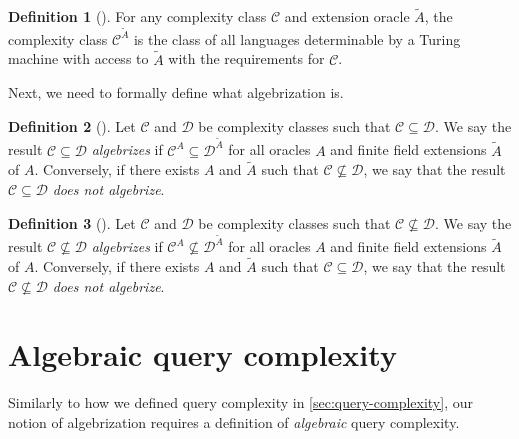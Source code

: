 \documentclass[english,12pt]{reedthesis}
\theoremstyle{plain}
\theoremstyle{definition}
\newtheorem{defn}[defn]{Definition}
\theoremstyle{remark}
\begin{document}
\begin{defn}[{\cite[Def.\ 2.2]{AW09}}]\label{def:ext-oracle-class}
  For any complexity class $\mathcal{C}$ and extension oracle $\tilde{A}$, the complexity
  class $\mathcal{C}^{\tilde{A}}$ is the class of all languages determinable by a Turing
  machine with access to $\tilde{A}$ with the requirements for $\mathcal{C}$.
\end{defn}

Next, we need to formally define what algebrization is.

\begin{defn}[{\cite[Def.\ 2.3]{AW09}}]\label{def:algebrization}
  Let $\mathcal{C}$ and $\mathcal{D}$ be complexity classes such that $\mathcal{C} \subseteq \mathcal{D}$. We say the result
  $\mathcal{C} \subseteq \mathcal{D}$ \emph{algebrizes} if $\mathcal{C}^{A} \subseteq \mathcal{D}^{\tilde{A}}$ for all oracles $A$ and
  finite field extensions $\tilde{A}$ of $A$. Conversely, if there exists $A$
  and $\tilde{A}$ such that $\mathcal{C} \nsubseteq \mathcal{D}$, we say that the result $\mathcal{C} \subseteq \mathcal{D}$ \emph{does
    not algebrize}.
\end{defn}

\begin{defn}[{\cite[Def.\ 2.3]{AW09}}]\label{def:algebrization-neq}
  Let $\mathcal{C}$ and $\mathcal{D}$ be complexity classes such that $\mathcal{C} \nsubseteq \mathcal{D}$. We say the result
  $\mathcal{C} \nsubseteq \mathcal{D}$ \emph{algebrizes} if $\mathcal{C}^{A} \nsubseteq \mathcal{D}^{\tilde{A}}$ for all oracles $A$ and
  finite field extensions $\tilde{A}$ of $A$. Conversely, if there exists $A$
  and $\tilde{A}$ such that $\mathcal{C} \subseteq \mathcal{D}$, we say that the result $\mathcal{C} \nsubseteq \mathcal{D}$ \emph{does
    not algebrize}.
\end{defn}

\section{Algebraic query complexity}\label{sec:alg-query-complexity}

Similarly to how we defined query complexity in \cref{sec:query-complexity}, our
notion of algebrization requires a definition of \emph{algebraic} query
complexity. %
\end{document}
